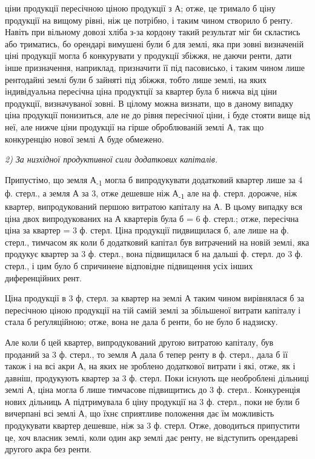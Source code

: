 \parcont{}  %
ціни продукції пересічною ціною продукції з А; отже, це тримало б ціну продукції
на вищому рівні, ніж це потрібно, і таким чином створило б ренту.
Навіть при вільному довозі хліба з-за кордону такий результат міг би скластись
або триматись, бо орендарі вимушені були б для землі, яка при зовні
визначеній ціні продукції могла б конкурувати у продукції збіжжя, не даючи
ренти, дати інше призначення, наприклад, призначити її під пасовисько, і таким
чином лише рентодайні землі були б зайняті під збіжжя, тобто лише землі,
на яких індивідуальна пересічна ціна продуктції за квартер була б нижча від
ціни продукції, визначуваної зовні. В цілому можна визнати, що в даному випадку
ціна продукції понизиться, але не до рівня пересічної ціни, і буде стояти
вище від неї, але нижче ціни продукції на гірше оброблюваній землі А, так
що конкуренцію нової землі А буде обмежено.

\emph{2) За низхідної продуктивної сили додаткових капіталів.}

Припустімо, що земля А\textsubscript{-1} могла б випродукувати додатковий квартер
лише за 4 ф. стерл., а земля А за 3, отже дешевше ніж А\textsubscript{-1} але на 
ф. стерл. дорожче, ніж квартер, випродукований першою витратою капіталу на
А. В цьому випадку вся ціна двох випродукованих на А квартерів була б =
6 ф. стерл.; отже, пересічна ціна за квартер = 3 ф. стерл. Ціна продукції
пидвищилася б, але лише на  ф. стерл., тимчасом як коли б додатковий
капітал був витрачений на новій землі, яка продукує квартер за 3
ф. стерл., вона підвищилася б на дальші  ф. стерл. до 3 ф. стерл., і цим
було б спричинене відповідне підвищення усіх інших диференційних рент.

Ціна продукції в 3 ф, стерл. за квартер на землі А таким чином
вирівнялася б за пересічною ціною продукції на тій самій землі за збільшеної
витрати капіталу і стала б реґуляційною; отже, вона не дала б ренти, бо не
було б надзиску.

Але коли б цей квартер, випродукований другою витратою капіталу, був проданий
за 3 ф. стерл., то земля А дала б тепер ренту в  ф. стерл.,
дала б її також і на всі акри А, на яких не зроблено додаткової витрати і
які, отже, як і давніш, продукують квартер за 3 ф. стерл. Поки існують ще
необроблені дільниці землі А, ціна могла б лише тимчасове підвищитись до
3 ф. стерл.. Конкуренція нових дільниць А підтримувала б ціну продукції
на 3 ф. стерл., поки не були б вичерпані всі землі А, що їхнє сприятливе положення
дає їм можливість продукувати квартер дешевше, ніж за 3 ф. стерл.
Отже, доводиться припустити це, хоч власник землі, коли один акр землі дає ренту,
не відступить орендареві другого акра без ренти.

